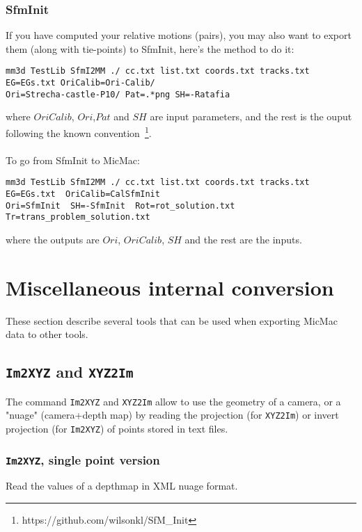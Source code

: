 \subsubsection*{SfmInit}
If you have computed your relative motions (pairs), you may also want to export them (along with tie-points) to SfmInit, here's the method to do it:
%
\begin{verbatim}
mm3d TestLib SfmI2MM ./ cc.txt list.txt coords.txt tracks.txt EG=EGs.txt OriCalib=Ori-Calib/ 
Ori=Strecha-castle-P10/ Pat=.*png SH=-Ratafia
\end{verbatim}
where $OriCalib$, $Ori$,$Pat$ and $SH$ are input parameters, and the rest is the ouput following the known convention~\footnote{https://github.com/wilsonkl/SfM\_Init}.\\\\ 
%
To go from SfmInit to MicMac:
\begin{verbatim}
mm3d TestLib SfmI2MM ./ cc.txt list.txt coords.txt tracks.txt EG=EGs.txt  OriCalib=CalSfmInit 
Ori=SfmInit  SH=-SfmInit  Rot=rot_solution.txt Tr=trans_problem_solution.txt
\end{verbatim}
where the outputs are $Ori$, $OriCalib$, $SH$ and the rest are the inputs.


\section{Miscellaneous internal conversion}

These section describe several tools that can be used when exporting MicMac data to
other tools.

\subsection{{\tt Im2XYZ} and {\tt XYZ2Im}}

The command {\tt Im2XYZ} and {\tt XYZ2Im}  allow to use the geometry of a camera, or a
"nuage" (camera+depth map) by reading the projection (for {\tt XYZ2Im}) or invert projection (for  {\tt Im2XYZ})
of points stored in text files.

\subsubsection{{\tt Im2XYZ}, single point version}

Read the values of a depthmap in XML nuage format.

